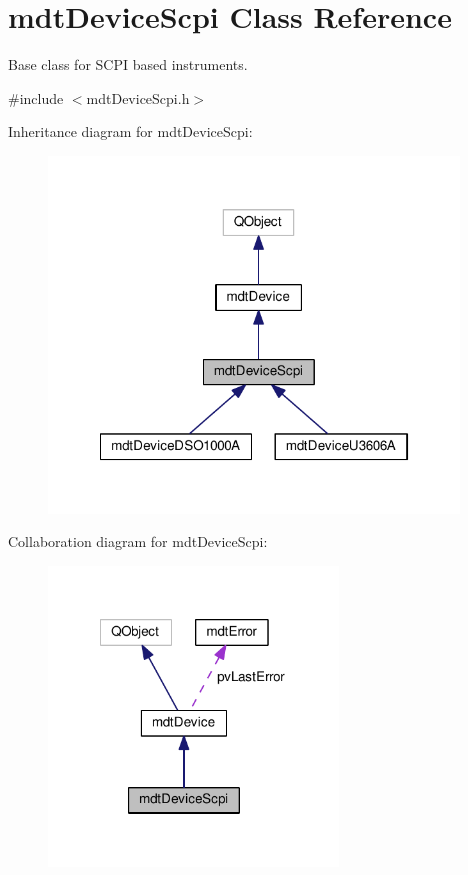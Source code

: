 \hypertarget{classmdt_device_scpi}{\section{mdt\-Device\-Scpi Class Reference}
\label{classmdt_device_scpi}
}


Base class for S\-C\-P\-I based instruments.  




{\ttfamily \#include $<$mdt\-Device\-Scpi.\-h$>$}



Inheritance diagram for mdt\-Device\-Scpi\-:
\nopagebreak
\begin{figure}[H]
\begin{center}
\leavevmode
\includegraphics[width=309pt]{classmdt_device_scpi__inherit__graph}
\end{center}
\end{figure}


Collaboration diagram for mdt\-Device\-Scpi\-:
\nopagebreak
\begin{figure}[H]
\begin{center}
\leavevmode
\includegraphics[width=218pt]{classmdt_device_scpi__coll__graph}
\end{center}
\end{figure}
